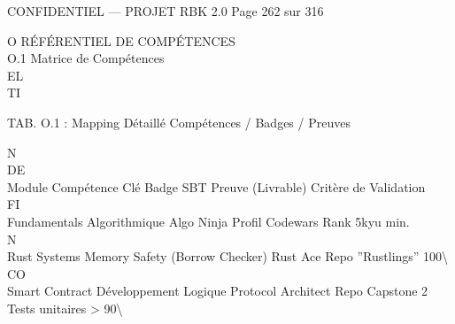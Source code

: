 \documentclass[12pt,landscape,a4paper]{article}
\newenvironment{confidential}
{\begin{tcolorbox}[
    colback=rbkred!5!white,
    colframe=rbkred!75!black,
    title=CONFIDENTIEL,
    fonttitle=\bfseries\color{white},
    coltitle=rbkred!75!black,
    breakable,
    enhanced,
    frame hidden,
    borderline west={2pt}{0pt}{rbkred!75!black}
]}
{\end{tcolorbox}}
\begin{document}
\vspace{0.5em}
\vspace{0.5em}
\begin{confidential}CONFIDENTIEL — PROJET RBK 2.0                                      Page 262 sur 316\end{confidential}
O \textbar{} RÉFÉRENTIEL DE COMPÉTENCES\\
\vspace{0.5em}
\vspace{0.5em}
O.1 Matrice de Compétences\\
\vspace{0.5em}
\vspace{0.5em}
\vspace{0.5em}
\vspace{0.5em}
EL\\
TI\\
\begin{center}\begin{tabular}TAB. O.1 : Mapping Détaillé Compétences / Badges / Preuves\end{tabular}\end{center}
\vspace{0.5em}
\vspace{0.5em}
\vspace{0.5em}
\vspace{0.5em}
N\\
DE\\
Module         Compétence Clé                  Badge SBT        Preuve (Livrable)      Critère de Validation\\
\vspace{0.5em}
\vspace{0.5em}
\vspace{0.5em}
\vspace{0.5em}
FI\\
Fundamentals   Algorithmique                   Algo Ninja       Profil Codewars        Rank 5kyu min.\\
\vspace{0.5em}
\vspace{0.5em}
\vspace{0.5em}
N\\
Rust Systems   Memory Safety (Borrow Checker) Rust Ace          Repo ”Rustlings”       100\textbackslash{}%
CO\\
Smart Contract Développement Logique           Protocol Architect Repo Capstone 2      Tests unitaires \textgreater{} 90\textbackslash{}%
\end{document}
